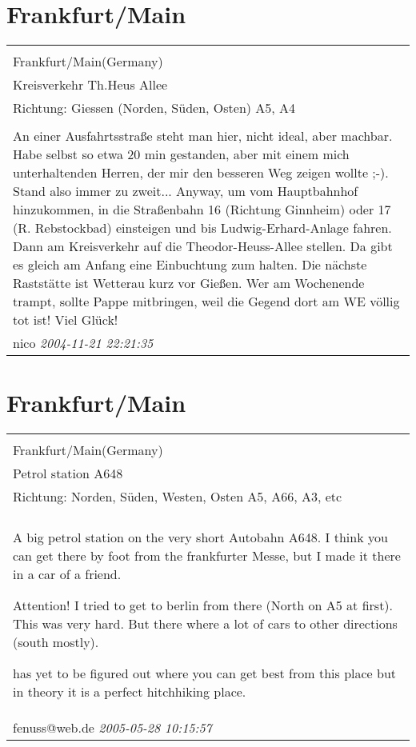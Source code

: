 \documentclass[a4paper,12pt]{article}
\begin{document}
\section{Frankfurt/Main}
\begin{tabular}{|p{13cm}|}
\hline\\
Frankfurt/Main(Germany)\\
Kreisverkehr Th.Heus Allee\\
Richtung: Giessen (Norden, Süden, Osten) A5, A4 \\
\hline\\
An einer Ausfahrtsstraße steht man hier, nicht ideal, aber machbar. Habe selbst so etwa 20 min gestanden, aber mit einem mich unterhaltenden Herren, der mir den besseren Weg zeigen wollte ;-). Stand also immer zu zweit... Anyway, um vom Hauptbahnhof hinzukommen, in die Straßenbahn 16 (Richtung Ginnheim) oder 17 (R. Rebstockbad) einsteigen und bis Ludwig-Erhard-Anlage fahren. Dann am Kreisverkehr auf die Theodor-Heuss-Allee stellen. Da gibt es gleich am Anfang eine Einbuchtung zum halten. Die nächste Raststätte ist Wetterau kurz vor Gießen. Wer am Wochenende trampt, sollte Pappe mitbringen, weil die Gegend dort am WE völlig tot ist! Viel Glück! \\
nico \textit{ 2004-11-21 22:21:35 }\\\hline
\end{tabular}


\section{Frankfurt/Main}
\begin{tabular}{|p{13cm}|}
\hline\\
Frankfurt/Main(Germany)\\
Petrol station A648\\
Richtung: Norden, Süden, Westen, Osten A5, A66, A3, etc \\
\hline\\
A big petrol station on the very short Autobahn A648. I think you can get there by foot from the frankfurter Messe, but I made it there in a car of a friend.

Attention! I tried to get to berlin from there (North on A5 at first). This was very hard. But there where a lot of cars to other directions (south mostly).

has yet to be figured out where you can get best from this place but in theory it is a perfect hitchhiking place. \\
fenuss@web.de \textit{ 2005-05-28 10:15:57 }\\\hline
\end{tabular}
\end{document}
